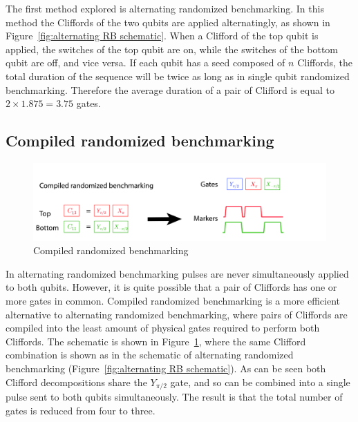         The first method explored is alternating randomized benchmarking. In this method the Cliffords of the two qubits are applied alternatingly, as shown in Figure~\ref{fig:alternating RB schematic}. When a Clifford of the top qubit is applied, the switches of the top qubit are on, while the switches of the bottom qubit are off, and vice versa. If each qubit has a seed composed of $n$ Cliffords, the total duration of the sequence will be twice as long as in single qubit randomized benchmarking. Therefore the average duration of a pair of Clifford is equal to $2 \times 1.875 = 3.75$ gates.


      \subsection{Compiled randomized benchmarking}
        \label{ssec:compiled randomized benchmarking}

        \begin{figure}[tb]
          \centering
          \includegraphics[width=\textwidth]{../Figures/Randomized benchmarking/compiled RB.jpg}
          \caption{Compiled randomized benchmarking}
          \label{fig:compiled RB schematic}
        \end{figure}

        In alternating randomized benchmarking pulses are never simultaneously applied to both qubits. However, it is quite possible that a pair of Cliffords has one or more gates in common. Compiled randomized benchmarking is a more efficient alternative to alternating randomized benchmarking, where pairs of Cliffords are compiled into the least amount of physical gates required to perform both Cliffords. The schematic is shown in Figure~\ref{fig:compiled RB schematic}, where the same Clifford combination is shown as in the schematic of alternating randomized benchmarking (Figure~\ref{fig:alternating RB schematic}). As can be seen both Clifford decompositions share the $Y_{\pi/2}$ gate, and so can be combined into a single pulse sent to both qubits simultaneously. The result is that the total number of gates is reduced from four to three.

